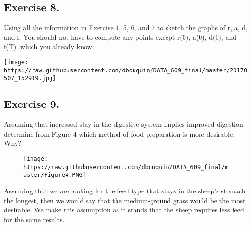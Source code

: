 \documentclass[]{article}
\begin{document}
\subsection{Exercise 8.}\label{exercise-8.}

Using all the information in Exercise 4, 5, 6, and 7 to sketch the
graphs of r, a, d, and f. You should not have to compute any points
except r(0), a(0), d(0), and f(T), which you already know.

\texttt{[image: https://raw.githubusercontent.com/dbouquin/DATA\_609\_final/master/20170507\_152919.jpg]}
\newpage

\subsection{Exercise 9.}\label{exercise-9.}

Assuming that increased stay in the digestive system implies improved
digestion determine from Figure 4 which method of food preparation is
more desirable. Why?

\begin{figure}[htbp]
\centering
\texttt{[image: https://raw.githubusercontent.com/dbouquin/DATA\_609\_final/master/Figure4.PNG]}
\caption{}
\end{figure}

Assuming that we are looking for the feed type that stays in the sheep's
stomach the longest, then we would say that the medium-ground grass
would be the most desirable. We make this assumption as it stands that
the sheep requires less feed for the same results.
\end{document}
